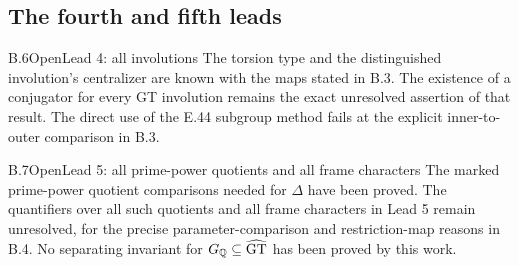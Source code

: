 \subsection{The fourth and fifth leads}

\begin{result}{B.6}{Open}{Lead 4: all involutions}
The torsion type and the distinguished involution's
centralizer are known with the maps stated in B.3.
The existence of a conjugator for every GT involution
remains the exact unresolved assertion of that result.
The direct use of the E.44 subgroup method fails at
the explicit inner-to-outer comparison in B.3.
\end{result}

\begin{result}{B.7}{Open}{Lead 5: all prime-power quotients and all frame characters}
The marked prime-power quotient comparisons needed
for $\Delta$ have been proved. The quantifiers over
all such quotients and all frame characters in Lead 5
remain unresolved, for the precise parameter-comparison
and restriction-map reasons in B.4. No separating
invariant for $G_{\mathbb Q}\subseteq\widehat{\mathrm{GT}}$ has been
proved by this work.
\end{result}
